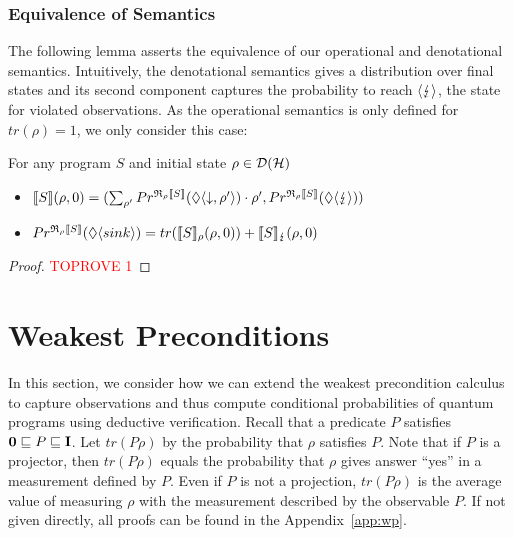 \documentclass[a4paper,UKenglish,cleveref, autoref, thm-restate]{lipics-v2021}
\begin{document}
\subsubsection{Equivalence of Semantics}
The following lemma asserts the equivalence of our operational and denotational semantics. Intuitively, the denotational semantics gives a distribution over final states and its second component captures the probability to reach $\langle \lightning \rangle$, the state for violated observations. As the operational semantics is only defined for $tr(\rho) = 1$, we only consider this case:
\begin{lemma}
    \label{lem:operationalVsDenotational}
    For any program $S$ and initial state $\rho \in \mathcal{D}(\mathcal{H})$
    \begin{itemize}
        \item $\llbracket S \rrbracket(\rho,0) = (\sum_{\rho'} Pr^{\mathfrak{R}_{\rho}\llbracket S \rrbracket}(\lozenge \langle \downarrow , \rho' \rangle) \cdot \rho',Pr^{\mathfrak{R}_{\rho}\llbracket S \rrbracket}(\lozenge \langle \lightning \rangle))$
        \item $Pr^{\mathfrak{R}_{\rho}\llbracket S \rrbracket}(\lozenge \langle sink \rangle) = tr(\llbracket S \rrbracket_{\rho}(\rho,0))+\llbracket S \rrbracket_{\lightning}(\rho,0)$
    \end{itemize}
\end{lemma}
\begin{proof}\textcolor{red}{TOPROVE 1}\end{proof} \section{Weakest Preconditions}
\label{sec:wp}

In this section, we consider how we can extend the weakest precondition calculus to capture observations and thus compute conditional probabilities of quantum programs using deductive verification. Recall that a predicate $P$ satisfies $\mathbf{0} \sqsubseteq P \sqsubseteq \textbf{I}$. Let $tr(P\rho)$ by the probability that $\rho$ satisfies $P$. Note that if $P$ is a projector, then $tr(P\rho)$ equals the probability that $\rho$ gives answer ``yes'' in a measurement defined by $P$. Even if $P$ is not a projection, $tr(P\rho)$ is the average value of measuring $\rho$ with the measurement described by the observable $P$. If not given directly, all proofs can be found in the Appendix~\ref{app:wp}.
\end{document}
